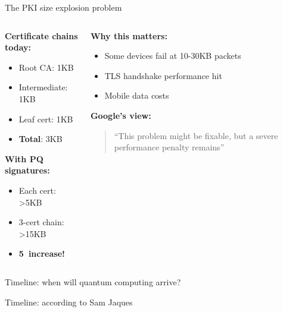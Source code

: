 \documentclass[aspectratio=169, lualatex, handout]{beamer}
\begin{document}
\begin{frame}{The PKI size explosion problem}
	\begin{columns}[c]
		\begin{column}{0.5\textwidth}
			\textbf{Certificate chains today:}
			\begin{itemize}
				\item Root CA: \approx1KB
				\item Intermediate: \approx1KB
				\item Leaf cert: \approx1KB
				\item \textbf{Total}: \approx3KB
			\end{itemize}
			\vspace{5mm}
			\textbf{With PQ signatures:}
			\begin{itemize}
				\item Each cert: >5KB
				\item 3-cert chain: >15KB
				\item \textbf{5\times\ increase!}
			\end{itemize}
		\end{column}
		\begin{column}{0.5\textwidth}
			\textbf{Why this matters:}
			\begin{itemize}
				\item Some devices fail at 10-30KB packets
				\item TLS handshake performance hit
				\item Mobile data costs
			\end{itemize}
			\vspace{5mm}
			\textbf{Google's view:}
			\begin{quote}
				``This problem might be fixable, but a severe performance penalty remains''
			\end{quote}
		\end{column}
	\end{columns}
\end{frame}

\begin{frame}{Timeline: when will quantum computing arrive?}
\end{frame}

\begin{frame}{Timeline: according to Sam Jaques}
\end{frame}
\end{document}

